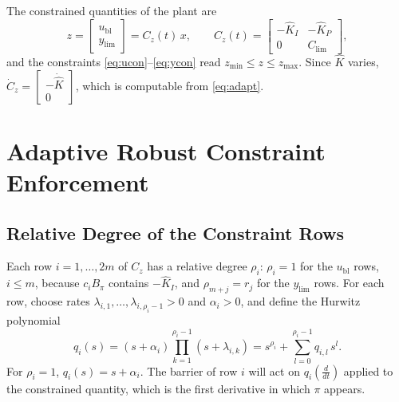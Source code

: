 \documentclass[lettersize,journal]{IEEEtran}
\newcommand{\Kh}{\hat{K}}
\newcommand{\Khd}{\dot{\hat{K}}}
\newcommand{\ub}{u_{\mathrm{bl}}}
\newcommand{\Clim}{C_{\mathrm{lim}}}
\newcommand{\ylim}{y_{\mathrm{lim}}}
\begin{document}
The constrained quantities of the plant are
\begin{equation}
z=\begin{bmatrix}\ub\\ \ylim\end{bmatrix}=C_z(t)\,x,\qquad
C_z(t)=\begin{bmatrix}-\Kh_I & -\Kh_P\\ 0 & \Clim\end{bmatrix}, \label{eq:Cz}
\end{equation}
and the constraints \eqref{eq:ucon}--\eqref{eq:ycon} read $z_{\min}\le z\le z_{\max}$. Since $\Kh$ varies, $\dot C_z=\begin{bmatrix}-\Khd\\ 0\end{bmatrix}$, which is computable from \eqref{eq:adapt}.

\section{Adaptive Robust Constraint Enforcement}

\subsection{Relative Degree of the Constraint Rows}

Each row $i=1,\dots,2m$ of $C_z$ has a relative degree $\rho_i$: $\rho_i=1$ for the $\ub$ rows, $i\le m$, because $c_iB_\pi$ contains $-\Kh_I$, and $\rho_{m+j}=r_j$ for the $\ylim$ rows. For each row, choose rates $\lambda_{i,1},\dots,\lambda_{i,\rho_i-1}>0$ and $\alpha_i>0$, and define the Hurwitz polynomial
\begin{equation}
q_i(s)=(s+\alpha_i)\prod_{k=1}^{\rho_i-1}(s+\lambda_{i,k}) = s^{\rho_i}+\sum_{l=0}^{\rho_i-1}q_{i,l}\,s^l. \label{eq:q}
\end{equation}
For $\rho_i=1$, $q_i(s)=s+\alpha_i$. The barrier of row $i$ will act on $q_i(\frac{d}{dt})$ applied to the constrained quantity, which is the first derivative in which $\pi$ appears.
\end{document}
